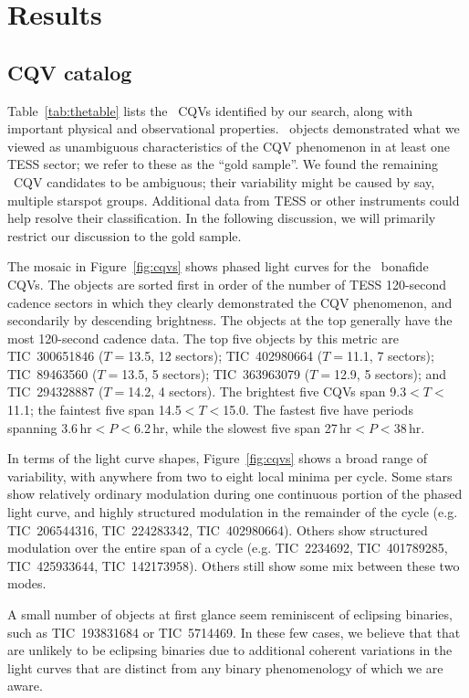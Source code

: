 \documentclass[11pt,twocolumn,tighten]{aastex63}
\begin{document}
\section{Results}
\label{sec:results}

\subsection{CQV catalog}
\label{sec:catalog}

Table~\ref{tab:thetable} lists the \ncpvsfound\ CQVs identified by our
search, along with important physical and observational properties.
\ngoods\ objects demonstrated what we viewed as unambiguous
characteristics of the CQV phenomenon in at least one TESS sector; we
refer to these as the ``gold sample''.  We found the remaining
\nmaybes\ CQV candidates to be ambiguous; their variability might be
caused by say, multiple starspot groups.  Additional data from TESS or
other instruments could help resolve their classification.  In the
following discussion, we will primarily restrict our discussion to the
gold sample.

The mosaic in Figure~\ref{fig:cqvs} shows phased light curves
for the \ngoods\ bonafide CQVs.  The objects are sorted first in order
of the number of TESS 120-second cadence sectors in which they clearly
demonstrated the CQV phenomenon, and secondarily by descending
brightness.  The objects at the top generally have the most 120-second
cadence data.  The top five objects by this metric are TIC~300651846
($T$$=$13.5, 12 sectors); TIC~402980664 ($T$$=$11.1, 7 sectors);
TIC~89463560 ($T$$=$13.5, 5 sectors); TIC~363963079 ($T$$=$12.9, 5
sectors); and TIC~294328887 ($T$$=$14.2, 4 sectors).  The brightest
five CQVs span 9.3$<$$T$$<$11.1; the faintest five span
14.5$<$$T$$<$15.0.  The fastest five have periods spanning
3.6\,hr$<$$P$$<$6.2\,hr, while the slowest five span
27\,hr$<$$P$$<$38\,hr.

In terms of the light curve shapes, Figure~\ref{fig:cqvs}
shows a broad range of variability, with anywhere from two to eight
local minima per cycle.  Some stars show relatively ordinary
modulation during one continuous portion of the phased light curve,
and highly structured modulation in the remainder of the cycle (e.g.
TIC~206544316, TIC~224283342, TIC~402980664).  Others show structured
modulation over the entire span of a cycle (e.g. TIC~2234692,
TIC~401789285, TIC~425933644, TIC~142173958).  Others still show some
mix between these two modes.

A small number of objects at first glance seem reminiscent of
eclipsing binaries, such as TIC~193831684 or TIC~5714469.  In these
few cases, we believe that that are unlikely to be eclipsing binaries
due to additional coherent variations in the light curves that are
distinct from any binary phenomenology of which we are aware.
\end{document}
